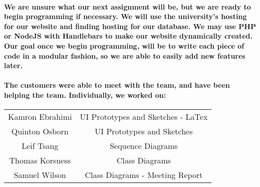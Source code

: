 \documentclass[12pt]{article}
\begin{document}
  \paragraph{\normalfont \indent We are unsure what our next assignment will be, but we are ready to begin programming if necessary. We will use the university’s hosting for our website and finding hosting for our database. We may use PHP or NodeJS with Handlebars to make our website dynamically created. Our goal once we begin programming, will be to write each piece of code in a modular fashion, so we are able to easily add new features later.
  }

  \paragraph{\normalfont \indent The customers were able to meet with the team, and have been helping the team. Individually, we worked on:
  }

\begin{center}
\begin{tabular}{ |c|c| }
 \hline
 Kamron Ebrahimi & UI Prototypes and Sketches - LaTex \\
 Quinton Osborn & UI Prototypes and Sketches \\
 Leif Tsang & Sequence Diagrams \\
 Thomas Korsness & Class Diagrams \\
 Samuel Wilson & Class Diagrams - Meeting Report \\
 \hline
\end{tabular}
\end{center}
\end{document}
